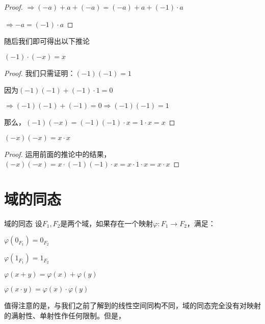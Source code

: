 \documentclass[12pt, a4paper, oneside, UTF8]{ctexbook}
\begin{document}
\begin{para}{0}
\begin{proof}
					$\Rightarrow (-a)+a+(-a)=(-a)+a+(-1)\cdot a$
					
					$\Rightarrow -a = (-1)\cdot a$
				\end{proof}
				随后我们即可得出以下推论
				\begin{corollary}{}{}
					$(-1)\cdot (-x) = x$
				\end{corollary}
				\begin{proof}
					我们只需证明：$(-1)(-1)=1$
					
					因为$(-1)(-1)+(-1)\cdot 1 = 0$
					
					$\Rightarrow (-1)(-1) + (-1) = 0 \Rightarrow (-1)(-1)=1$
					
					那么，$(-1)(-x)=(-1)(-1)\cdot x = 1\cdot x = x$
				\end{proof}
				\begin{corollary}{}{}
					$(-x)(-x)=x \cdot x$
				\end{corollary}
				\begin{proof}
					运用前面的推论中的结果，$(-x)(-x)=x\cdot (-1)(-1)\cdot x = x\cdot 1\cdot x = x\cdot x$
				\end{proof}
		\end{para}
			
	\section{域的同态}
		\begin{defn}{域的同态}
			设$F_1,F_2$是两个域，如果存在一个映射$\varphi:F_1 \rightarrow F_2$，满足：
			
			 $\varphi (0_{F_1}) = 0_{F_2}$
			
			 $\varphi (1_{F_1}) = 1_{F_2}$
			
			 $\varphi (x+y) = \varphi (x)+\varphi (y)$
			
			 $\varphi (x\cdot y) = \varphi (x) \cdot \varphi (y)$
		\end{defn}
		值得注意的是，与我们之前了解到的线性空间同构不同，域的同态完全没有对映射的满射性、单射性作任何限制。但是，
		
\end{document}
